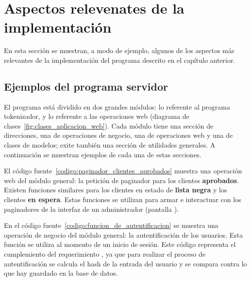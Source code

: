 %
%

\section{Aspectos relevenates de la implementación}
\label{sec:codigo_sistema_tokenizador}

En esta sección se muestran, a modo de ejemplo, algunos de los aspectos más
relevantes de la implementación del programa descrito en el capítulo anterior.

\subsection{Ejemplos del programa servidor}

El programa está dividido en dos grandes módulos: lo referente al programa
tokenizador, y lo referente a las operaciones web (diagrama de
clases~\ref{fig:clases_aplicacion_web}). Cada módulo tiene una sección de
direcciones, una de operaciones de negocio, una de operaciones web y una de
clases de modelos; exite también una sección de utilidades generales. A
continuación se muestran ejemplos de cada una de estas secciones.

El código fuente~\ref{codigo:paginador_clientes_aprobados} muestra una
operación web del módulo general: la petición de paginador para los clientes
\textbf{aprobados}. Existen funciones similares para los clientes en estado de
\textbf{lista negra} y los clientes \textbf{en espera}. Estas funciones se
utilizan para armar e interactuar con los paginadores de la interfaz de un
administrador (pantalla ).


En el código fuente~\ref{codigo:funcion_de_autentificacion} se muestra una
operación de negocio del módulo general: la autentificación de los usuarios.
Esta función se utiliza al momento de un inicio de sesión. Este código
representa el cumplemiento del requerimiento
, ya que para realizar el
proceso de autentificación se calcula el hash de la entrada del usuario y se
compara contra lo que hay guardado en la base de datos.


